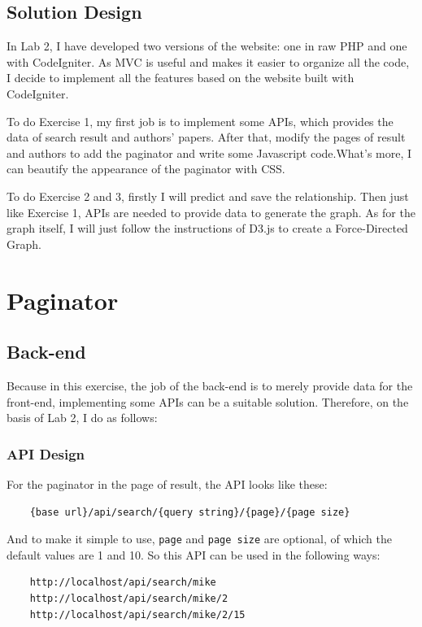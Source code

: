 \documentclass[a4paper]{article}
\begin{document}
        \subsection{Solution Design}
In Lab 2, I have developed two versions of the website: one in raw PHP and one with CodeIgniter. As MVC is useful and makes it easier to organize all the code, I decide to implement all the features based on the website built with CodeIgniter.

To do Exercise 1, my first job is to implement some APIs, which provides the data of search result and authors' papers. After that, modify the pages of result and authors to add the paginator and write some Javascript code.What's more, I can beautify the appearance of the paginator with CSS.

To do Exercise 2 and 3, firstly I will predict and save the relationship. Then just like Exercise 1, APIs are needed to provide data to generate the graph. As for the graph itself, I will just follow the instructions of D3.js to create a Force-Directed Graph.

    \newpage
    \section{Paginator}
        \subsection{Back-end}
Because in this exercise, the job of the back-end is to merely provide data for the front-end, implementing some APIs can be a suitable solution. Therefore, on the basis of Lab 2, I do as follows:
            \subsubsection{API Design}
For the paginator in the page of result, the API looks like these:
\begin{verbatim}
    {base url}/api/search/{query string}/{page}/{page size}
\end{verbatim}

And to make it simple to use, \texttt{{page}} and \texttt{{page size}} are optional, of which the default values are 1 and 10. So this API can be used in the following ways:
\begin{verbatim}
    http://localhost/api/search/mike
    http://localhost/api/search/mike/2
    http://localhost/api/search/mike/2/15
\end{verbatim}
\end{document}
